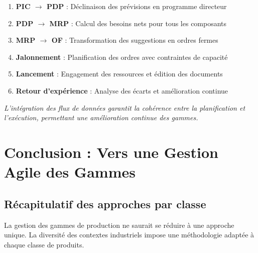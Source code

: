 \documentclass{article}
\begin{document}
\begin{table}[h]
\begin{tcolorbox}[colback=blueclair, colframe=blue!70!black, title=Synthèse : Intégration et Flux de Données]
\begin{enumerate}
    \item \textbf{PIC $\rightarrow$ PDP} : Déclinaison des prévisions en programme directeur
    \item \textbf{PDP $\rightarrow$ MRP} : Calcul des besoins nets pour tous les composants
    \item \textbf{MRP $\rightarrow$ OF} : Transformation des suggestions en ordres fermes
    \item \textbf{Jalonnement} : Planification des ordres avec contraintes de capacité
    \item \textbf{Lancement} : Engagement des ressources et édition des documents
    \item \textbf{Retour d'expérience} : Analyse des écarts et amélioration continue
\end{enumerate}
\vspace{0.5em}
\textit{L'intégration des flux de données garantit la cohérence entre la planification et l'exécution, permettant une amélioration continue des gammes.}
\end{tcolorbox}

\section*{Conclusion : Vers une Gestion Agile des Gammes}

\subsection*{Récapitulatif des approches par classe}

La gestion des gammes de production ne saurait se réduire à une approche unique. La diversité des contextes industriels impose une méthodologie adaptée à chaque classe de produits.


\end{table}
\end{document}
